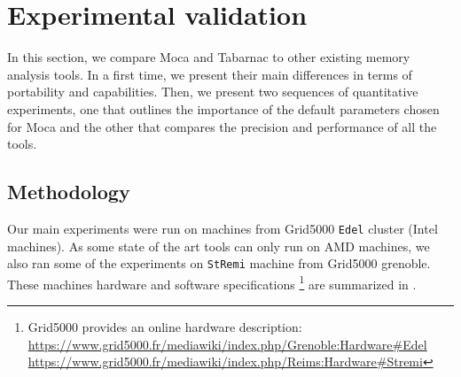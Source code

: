 \section{Experimental validation}
\label{sec:moca-expe}

In this section, we compare \gls{Moca} and \gls{Tabarnac} to other existing memory analysis tools.
In a first time, we present their main differences in terms of portability and capabilities.
Then, we present two sequences of quantitative experiments, one that outlines the importance of the default parameters chosen for \gls{Moca} and the other that compares the precision and performance of all the tools.

\subsection{Methodology}

Our main experiments were run on  machines from \gls{Grid5000} \texttt{Edel}
cluster (Intel machines).
As some state of the art tools can only run on \gls{AMD} machines, we also ran
    some of the experiments on
    \texttt{StRemi} machine from \gls{Grid5000} grenoble.
    These machines hardware and software specifications%
    \footnote{\gls{Grid5000} provides an online hardware description:\\
       \url{https://www.grid5000.fr/mediawiki/index.php/Grenoble:Hardware\#Edel}
       \\\url{https://www.grid5000.fr/mediawiki/index.php/Reims:Hardware\#Stremi}}
    are summarized in .

